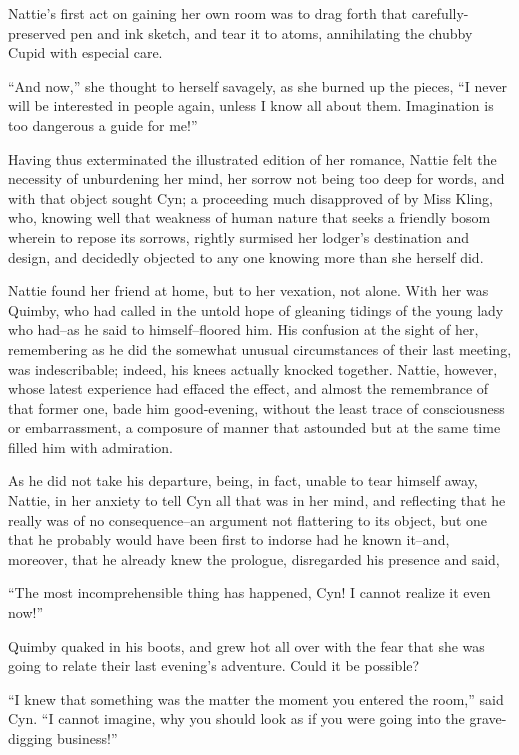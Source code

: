 Nattie's first act on gaining her own room was to drag forth that
carefully-preserved pen and ink sketch, and tear it to atoms,
annihilating the chubby Cupid with especial care.

``And now,'' she thought to herself savagely, as she burned up the pieces,
``I never will be interested in people again, unless I know all about
them. Imagination is too dangerous a guide for me!''

Having thus exterminated the illustrated edition of her romance, Nattie
felt the necessity of unburdening her mind, her sorrow not being too
deep for words, and with that object sought Cyn; a proceeding much
disapproved of by Miss Kling, who, knowing well that weakness of human
nature that seeks a friendly bosom wherein to repose its sorrows,
rightly surmised her lodger's destination and design, and decidedly
objected to any one knowing more than she herself did.

Nattie found her friend at home, but to her vexation, not alone. With
her was Quimby, who had called in the untold hope of gleaning tidings of
the young lady who had--as he said to himself--floored him. His
confusion at the sight of her, remembering as he did the somewhat
unusual circumstances of their last meeting, was indescribable; indeed,
his knees actually knocked together. Nattie, however, whose latest
experience had effaced the effect, and almost the remembrance of that
former one, bade him good-evening, without the least trace of
consciousness or embarrassment, a composure of manner that astounded but
at the same time filled him with admiration.

As he did not take his departure, being, in fact, unable to tear himself
away, Nattie, in her anxiety to tell Cyn all that was in her mind, and
reflecting that he really was of no consequence--an argument not
flattering to its object, but one that he probably would have been first
to indorse had he known it--and, moreover, that he already knew the
prologue, disregarded his presence and said,

``The most incomprehensible thing has happened, Cyn! I cannot realize it
even now!''

Quimby quaked in his boots, and grew hot all over with the fear that she
was going to relate their last evening's adventure. Could it be
possible?

``I knew that something was the matter the moment you entered the room,''
said Cyn. ``I cannot imagine, why you should look as if you were going
into the grave-digging business!''

